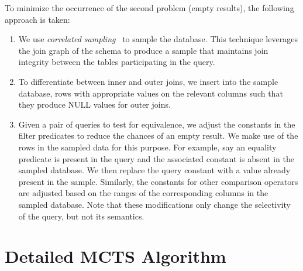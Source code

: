To minimize the occurrence of the second problem (empty results), the following approach is taken:
\begin{enumerate} \denselist
\item We use \textit{correlated sampling}~\cite{cs2} to sample the database. This technique leverages the join graph of the schema to produce a sample that maintains join integrity between the tables participating in the query.
\item To differentiate between inner and outer joins, we insert into the sample database, rows with appropriate values on the relevant columns such that they produce NULL values for outer joins.
\item Given a pair of queries to test for equivalence, we adjust the constants in the filter predicates to reduce the chances of an empty result. We make use of the rows in the sampled data for this purpose. For example, say an equality predicate is present in the query and the associated constant is absent in the sampled database. We then replace the query constant with a value already present in the sample. Similarly, the constants for other comparison operators are adjusted based on the ranges of the corresponding columns in the sampled database. 
%
Note that these modifications only change the selectivity of the query, but not its semantics.
\end{enumerate}

\newpage
\section{Detailed MCTS Algorithm}
\label{app:mcts}

